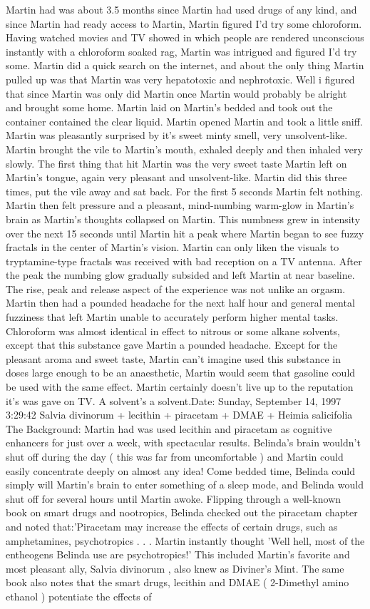\documentclass[12pt]{book}
\begin{document}
Martin had was about 3.5 months since Martin had used drugs of any kind, and since Martin had ready access to Martin, Martin figured I'd try some chloroform. Having watched movies and TV showed in which people are rendered unconscious instantly with a chloroform soaked rag, Martin was intrigued and figured I'd try some. Martin did a quick search on the internet, and about the only thing Martin pulled up was that Martin was very hepatotoxic and nephrotoxic. Well i figured that since Martin was only did Martin once Martin would probably be alright and brought some home. Martin laid on Martin's bedded and took out the container contained the clear liquid. Martin opened Martin and took a little sniff. Martin was pleasantly surprised by it's sweet minty smell, very unsolvent-like. Martin brought the vile to Martin's mouth, exhaled deeply and then inhaled very slowly. The first thing that hit Martin was the very sweet taste Martin left on Martin's tongue, again very pleasant and unsolvent-like. Martin did this three times, put the vile away and sat back. For the first 5 seconds Martin felt nothing. Martin then felt pressure and a pleasant, mind-numbing warm-glow in Martin's brain as Martin's thoughts collapsed on Martin. This numbness grew in intensity over the next 15 seconds until Martin hit a peak where Martin began to see fuzzy fractals in the center of Martin's vision. Martin can only liken the visuals to tryptamine-type fractals was received with bad reception on a TV antenna. After the peak the numbing glow gradually subsided and left Martin at near baseline. The rise, peak and release aspect of the experience was not unlike an orgasm. Martin then had a pounded headache for the next half hour and general mental fuzziness that left Martin unable to accurately perform higher mental tasks. Chloroform was almost identical in effect to nitrous or some alkane solvents, except that this substance gave Martin a pounded headache. Except for the pleasant aroma and sweet taste, Martin can't imagine used this substance in doses large enough to be an anaesthetic, Martin would seem that gasoline could be used with the same effect. Martin certainly doesn't live up to the reputation it's was gave on TV. A solvent's a solvent.Date: Sunday, September 14, 1997 3:29:42 Salvia divinorum + lecithin + piracetam + DMAE + Heimia salicifolia The Background: Martin had was used lecithin and piracetam as cognitive enhancers for just over a week, with spectacular results. Belinda's brain wouldn't shut off during the day ( this was far from uncomfortable ) and Martin could easily concentrate deeply on almost any idea! Come bedded time, Belinda could simply will Martin's brain to enter something of a sleep mode, and Belinda would shut off for several hours until Martin awoke. Flipping through a well-known book on smart drugs and nootropics, Belinda checked out the piracetam chapter and noted that:'Piracetam may increase the effects of certain drugs, such as amphetamines, psychotropics . . .  Martin instantly thought 'Well hell, most of the entheogens Belinda use are psychotropics!' This included Martin's favorite and most pleasant ally, Salvia divinorum , also knew as Diviner's Mint. The same book also notes that the smart drugs, lecithin and DMAE ( 2-Dimethyl amino ethanol ) potentiate the effects of 
\end{document}
